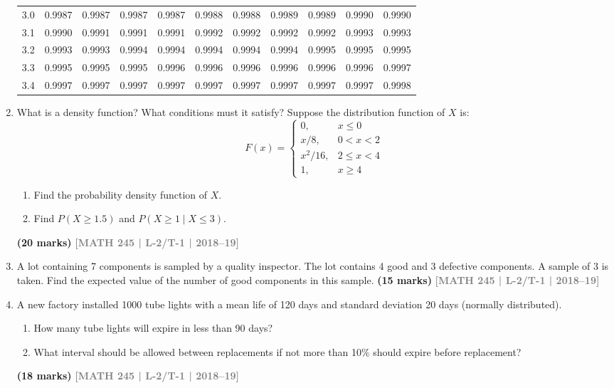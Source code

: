 \documentclass[12pt,a4paper]{article}
\newcommand{\yr}[1]{\hfill\textcolor{gray}{\small\textbf{[#1]}}}
\newcommand{\mk}[1]{\textcolor{orange!70!black}{\small\textbf{(#1 marks)}}}
\begin{document}
\begin{enumerate}
\begin{center}
\begin{longtable}{ccccccccccc}
3.0 & 0.9987 & 0.9987 & 0.9987 & 0.9987 & 0.9988 & 0.9988 & 0.9989 & 0.9989 & 0.9990 & 0.9990 \\
3.1 & 0.9990 & 0.9991 & 0.9991 & 0.9991 & 0.9992 & 0.9992 & 0.9992 & 0.9992 & 0.9993 & 0.9993 \\
3.2 & 0.9993 & 0.9993 & 0.9994 & 0.9994 & 0.9994 & 0.9994 & 0.9994 & 0.9995 & 0.9995 & 0.9995 \\
3.3 & 0.9995 & 0.9995 & 0.9995 & 0.9996 & 0.9996 & 0.9996 & 0.9996 & 0.9996 & 0.9996 & 0.9997 \\
3.4 & 0.9997 & 0.9997 & 0.9997 & 0.9997 & 0.9997 & 0.9997 & 0.9997 & 0.9997 & 0.9997 & 0.9998 \\
\end{longtable}
\end{center}

\item What is a density function? What conditions must it satisfy? Suppose the distribution function of $X$ is:
\[
F(x)=\begin{cases} 0, & x\le 0 \\ x/8, & 0<x<2 \\ x^{2}/16, & 2\le x<4 \\ 1, & x\ge 4 \end{cases}
\]
\begin{enumerate}
  \item Find the probability density function of $X$.
  \item Find $P(X\ge 1.5)$ and $P(X\ge 1\mid X\le 3)$.
\end{enumerate}
\mk{20} \yr{MATH 245 | L-2/T-1 | 2018--19}

\item A lot containing 7 components is sampled by a quality inspector. The lot contains 4 good and 3 defective components. A sample of 3 is taken. Find the expected value of the number of good components in this sample.
\mk{15} \yr{MATH 245 | L-2/T-1 | 2018--19}

\item A new factory installed 1000 tube lights with a mean life of 120 days and standard deviation 20 days (normally distributed).
\begin{enumerate}
  \item How many tube lights will expire in less than 90 days?
  \item What interval should be allowed between replacements if not more than 10\% should expire before replacement?
\end{enumerate}
\mk{18} \yr{MATH 245 | L-2/T-1 | 2018--19}



\end{enumerate}
\end{document}
